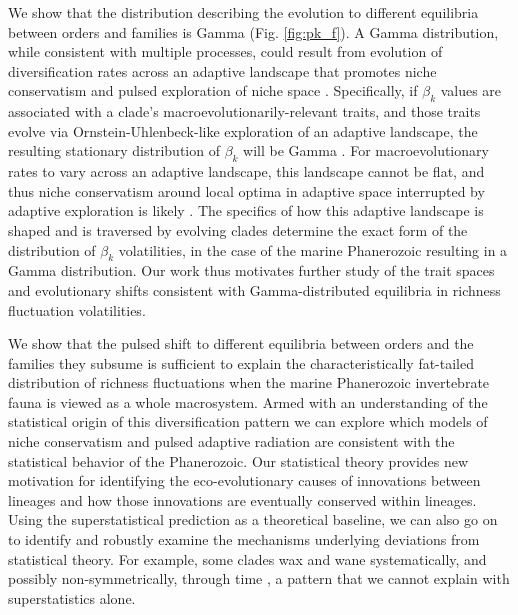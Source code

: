 \documentclass[12pt]{article}
\let\citep=\cite
\begin{document}
We show that the distribution describing the evolution to different
equilibria between orders and families is Gamma (Fig. \ref{fig:pk_f}).
A Gamma distribution, while consistent with multiple processes, could
result from evolution of diversification rates across an adaptive
landscape that promotes niche conservatism and pulsed exploration of
niche space \citep{cir1985}.  Specifically, if $\beta_k$ values are
associated with a clade's macroevolutionarily-relevant traits, and
those traits evolve via Ornstein-Uhlenbeck-like exploration of an
adaptive landscape, the resulting stationary distribution of $\beta_k$
will be Gamma \citep{cir1985, butler2004}.  For macroevolutionary
rates to vary across an adaptive landscape, this landscape cannot be
flat, and thus niche conservatism around local optima in adaptive
space interrupted by adaptive exploration is likely
\citep{newman1985adaptive, gavrilets2004book}. The specifics of how
this adaptive landscape is shaped and is traversed by evolving clades
determine the exact form of the distribution of $\beta_k$
volatilities, in the case of the marine Phanerozoic resulting in a
Gamma distribution. Our work thus motivates further study of the trait
spaces and evolutionary shifts consistent with Gamma-distributed
equilibria in richness fluctuation volatilities.

We show that the pulsed shift to different equilibria between orders
and the families they subsume is sufficient to explain the
characteristically fat-tailed distribution of richness fluctuations
when the marine Phanerozoic invertebrate fauna is viewed as a whole
macrosystem.  Armed with an understanding of the statistical origin of
this diversification pattern we can explore which models of niche
conservatism and pulsed adaptive radiation are consistent with the
statistical behavior of the Phanerozoic. Our statistical theory
provides new motivation for identifying the eco-evolutionary causes of
innovations between lineages and how those innovations are eventually
conserved within lineages. Using the superstatistical prediction as a
theoretical baseline, we can also go on to identify and robustly
examine the mechanisms underlying deviations from statistical
theory. For example, some clades wax and wane systematically, and
possibly non-symmetrically, through time \citep{liow2007,
  foote2008paleobiol, quental2013}, a pattern that we cannot explain
with superstatistics alone.
\end{document}
